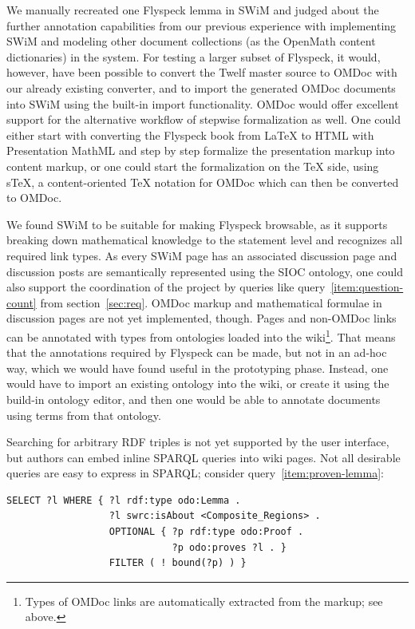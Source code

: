 We manually recreated one Flyspeck lemma in SWiM and judged about the further annotation
capabilities from our previous experience with implementing SWiM and modeling other
document collections (as the OpenMath content dictionaries) in the system. For testing a larger subset of Flyspeck, it would, however, have been possible to
convert the Twelf master source to OMDoc with our already existing converter, and to
import the generated OMDoc documents into SWiM using the built-in import functionality.
OMDoc would offer excellent support for the alternative workflow of stepwise formalization
as well\cite[chap.\ 4]{Kohlhase:omdoc1.2}.  One could either start with converting the
Flyspeck book from {\LaTeX} to HTML with Presentation MathML and step by step formalize
the presentation markup into content markup, or one could start the formalization on the
{\TeX} side, using s\TeX{}, a content-oriented {\TeX} notation for OMDoc which can then be
converted to OMDoc\cite{Kohlhase:albwo06}.

We found SWiM to be suitable for making Flyspeck browsable, as it supports
breaking down mathematical knowledge to the statement level and recognizes all
required link types.  As every SWiM page has an associated discussion page and
discussion posts are semantically represented using the SIOC
ontology\cite{SIOC:web}, one could also support the coordination of the project
by queries like query~\ref{item:question-count} from section~\ref{sec:req}.
OMDoc markup and mathematical formulae in discussion pages are not yet
implemented, though.  Pages and non-OMDoc links can be annotated with types from
ontologies loaded into the wiki\footnote{Types of OMDoc links are automatically
  extracted from the markup; see above.}.  That means that the annotations
required by Flyspeck can be made, but not in an ad-hoc way, which we would have
found useful in the prototyping phase.  Instead, one would have to import an
existing ontology into the wiki, or create it using the build-in ontology
editor, and then one would be able to annotate documents using terms from that
ontology.

Searching for arbitrary RDF triples is not yet supported by the user interface,
but authors can embed inline SPARQL queries into wiki pages.  Not all desirable
queries are easy to express in SPARQL; consider query~\ref{item:proven-lemma}:

\begin{lstlisting}
SELECT ?l WHERE { ?l rdf:type odo:Lemma .
                  ?l swrc:isAbout <Composite_Regions> .
                  OPTIONAL { ?p rdf:type odo:Proof .
                             ?p odo:proves ?l . }
                  FILTER ( ! bound(?p) ) }
\end{lstlisting}

